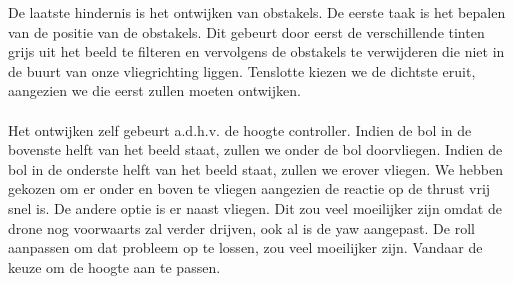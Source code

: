 \noindent
De laatste hindernis is het ontwijken van obstakels. De eerste taak is het bepalen van de positie van de obstakels. Dit gebeurt door eerst de verschillende tinten grijs uit het beeld te filteren en vervolgens de obstakels te verwijderen die niet in de buurt van onze vliegrichting liggen. Tenslotte kiezen we de dichtste eruit, aangezien we die eerst zullen moeten ontwijken.
\\
\\
Het ontwijken zelf gebeurt a.d.h.v. de hoogte controller. Indien de bol in de bovenste helft van het beeld staat, zullen we onder de bol doorvliegen. Indien de bol in de onderste helft van het beeld staat, zullen we erover vliegen. We hebben gekozen om er onder en boven te vliegen aangezien de reactie op de thrust vrij snel is. De andere optie is er naast vliegen. Dit zou veel moeilijker zijn omdat de drone nog voorwaarts zal verder drijven, ook al is de yaw aangepast. De roll aanpassen om dat probleem op te lossen, zou veel moeilijker zijn. Vandaar de keuze om de hoogte aan te passen.